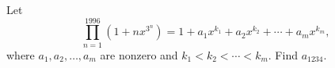Let
\[
\prod_{n=1}^{1996}\left(1+nx^{3^n}\right)=1+a_1x^{k_1}+a_2x^{k_2}+\cdots+a_mx^{k_m},
\]
where $a_1,a_2,\dots,a_m$ are nonzero and $k_1<k_2<\cdots<k_m$. Find $a_{1234}$.
